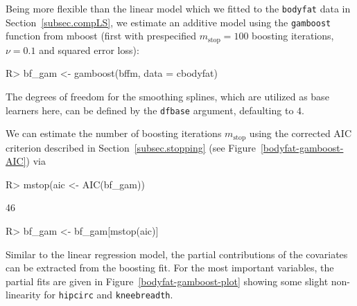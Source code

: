 \documentclass{article}
\newcommand{\Rpackage}[1]{{\normalfont\fontseries{b}\selectfont #1}}
\newcommand{\Robject}[1]{\texttt{#1}}
\newcommand{\Rcmd}[1]{\texttt{#1}}
\newenvironment{Schunk}{}{}
\begin{document}

Being more flexible than the linear model which we fitted to the
\Robject{bodyfat} data in Section~\ref{subsec.compLS}, we estimate an additive
model using the \Rcmd{gamboost} function from \Rpackage{mboost} (first with
prespecified $m_\text{stop} = 100$ 
boosting iterations, $\nu = 0.1$ and squared error loss):
\begin{Schunk}
\begin{Sinput}
R> bf_gam <- gamboost(bffm, data = cbodyfat)
\end{Sinput}
\end{Schunk}
The degrees of freedom for the smoothing splines, which are utilized as
base learners here, 
can be defined by the \Rcmd{dfbase} argument, defaulting to $4$. 

We can estimate the number of boosting iterations $m_\text{stop}$
using the corrected AIC criterion described in
Section~\ref{subsec.stopping}
(see Figure~\ref{bodyfat-gamboost-AIC}) via
\begin{Schunk}
\begin{Sinput}
R> mstop(aic <- AIC(bf_gam))
\end{Sinput}
\begin{Soutput}
[1] 46
\end{Soutput}
\begin{Sinput}
R> bf_gam <- bf_gam[mstop(aic)]
\end{Sinput}
\end{Schunk}
Similar to the linear regression model, the partial contributions of the covariates
can be extracted from the boosting fit. For the most important variables, 
the partial fits are given in Figure~\ref{bodyfat-gamboost-plot} showing some 
slight non-linearity for \Robject{hipcirc} and \Robject{kneebreadth}.
\end{document}
